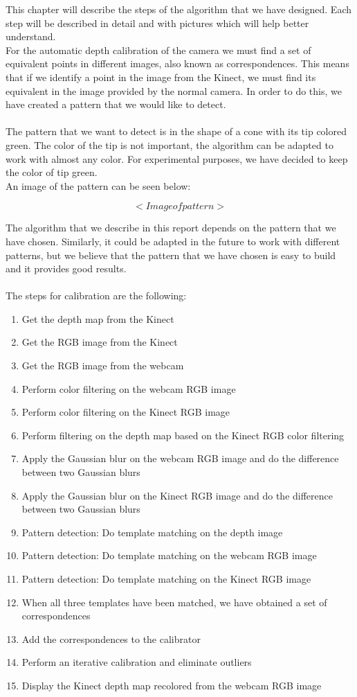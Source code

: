 \noindent
This chapter will describe the steps of the algorithm that we have designed. Each step will be described in detail and with pictures which will help better understand.
\\
For the automatic depth calibration of the camera we must find a set of equivalent points in different images, also known as correspondences. This means that if we identify a point in the image from the Kinect, we must find its equivalent in the image provided by the normal camera. In order to do this, we have created a pattern that we would like to detect. 
\\\\
The pattern that we want to detect is in the shape of a cone with its tip colored green. The color of the tip is not important, the algorithm can be adapted to work with almost any color. For experimental purposes, we have decided to keep the color of tip green. 
\\
An image of the pattern can be seen below:

$$ <Image of pattern> $$

\noindent
The algorithm that we describe in this report depends on the pattern that we have chosen. Similarly, it could be adapted in the future to work with different patterns, but we believe that the pattern that we have chosen is easy to build and it provides good results. 
\\\\
The steps for calibration are the following:
\begin{enumerate}
	\item Get the depth map from the Kinect
	\item Get the RGB image from the Kinect
	\item Get the RGB image from the webcam
	\item Perform color filtering on the webcam RGB image
	\item Perform color filtering on the Kinect RGB image
	\item Perform filtering on the depth map based on the Kinect RGB color filtering 
	\item Apply the Gaussian blur on the webcam RGB image and do the difference between two Gaussian blurs
	\item Apply the Gaussian blur on the Kinect RGB image and do the difference between two Gaussian blurs
	\item Pattern detection: Do template matching on the depth image
	\item Pattern detection: Do template matching on the webcam RGB image
	\item Pattern detection: Do template matching on the Kinect RGB image
	\item When all three templates have been matched, we have obtained a set of correspondences
	\item Add the correspondences to the calibrator
	\item Perform an iterative calibration and eliminate outliers
	\item Display the Kinect depth map recolored from the webcam RGB image 	
\end{enumerate}

